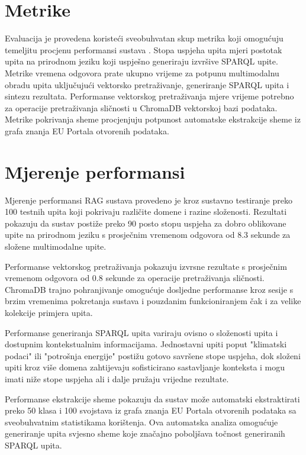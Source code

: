 \section{Metrike}
\label{sec:metrics}

Evaluacija je provedena koristeći sveobuhvatan skup metrika koji omogućuju temeljitu procjenu performansi sustava \cite{charalabidis2018open, neumaier2016automated}. Stopa uspjeha upita mjeri postotak upita na prirodnom jeziku koji uspješno generiraju izvršive SPARQL upite. Metrike vremena odgovora prate ukupno vrijeme za potpunu multimodalnu obradu upita uključujući vektorsko pretraživanje, generiranje SPARQL upita i sintezu rezultata. Performanse vektorskog pretraživanja mjere vrijeme potrebno za operacije pretraživanja sličnosti u ChromaDB vektorskoj bazi podataka. Metrike pokrivanja sheme procjenjuju potpunost automatske ekstrakcije sheme iz grafa znanja EU Portala otvorenih podataka.

\section{Mjerenje performansi}
\label{sec:performance_benchmarking}

Mjerenje performansi RAG sustava provedeno je kroz sustavno testiranje preko 100 testnih upita koji pokrivaju različite domene i razine složenosti. Rezultati pokazuju da sustav postiže preko 90 posto stopu uspjeha za dobro oblikovane upite na prirodnom jeziku s prosječnim vremenom odgovora od 8.3 sekunde za složene multimodalne upite.

Performanse vektorskog pretraživanja pokazuju izvrsne rezultate s prosječnim vremenom odgovora od 0.8 sekunde za operacije pretraživanja sličnosti. ChromaDB trajno pohranjivanje omogućuje dosljedne performanse kroz sesije s brzim vremenima pokretanja sustava i pouzdanim funkcioniranjem čak i za velike kolekcije primjera upita.

Performanse generiranja SPARQL upita variraju ovisno o složenosti upita i dostupnim kontekstualnim informacijama. Jednostavni upiti poput "klimatski podaci" ili "potrošnja energije" postižu gotovo savršene stope uspjeha, dok složeni upiti kroz više domena zahtijevaju sofisticirano sastavljanje konteksta i mogu imati niže stope uspjeha ali i dalje pružaju vrijedne rezultate.

Performanse ekstrakcije sheme pokazuju da sustav može automatski ekstraktirati preko 50 klasa i 100 svojstava iz grafa znanja EU Portala otvorenih podataka sa sveobuhvatnim statistikama korištenja. Ova automatska analiza omogućuje generiranje upita svjesno sheme koje značajno poboljšava točnost generiranih SPARQL upita.

